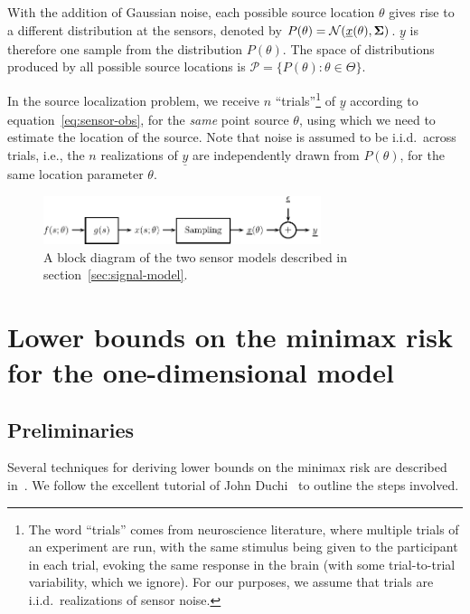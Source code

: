 \documentclass[conference,letterpaper]{IEEEtran}
\providecommand{\v}{}
\renewcommand{\v}[1]{\underline{#1}}
\providecommand{\m}{}
\renewcommand{\m}[1]{{\bf #1}}
\begin{document}
With the addition of Gaussian noise, each possible source location $\theta$
gives rise to a different distribution at the sensors, denoted by $P(\theta) =
\mathcal{N}(\v x(\theta), \m \Sigma)$. $\v y$ is therefore one sample from the
distribution $P(\theta)$. The space of distributions produced by all possible
source locations is $\mathcal{P} = \{P(\theta) : \theta \in \Theta \}$.

In the source localization problem, we receive $n$ ``trials''\footnote{The word
	``trials'' comes from neuroscience literature, where multiple trials of an
	experiment are run, with the same stimulus being given to the participant
	in each trial, evoking the same response in the brain (with some
trial-to-trial variability, which we ignore). For our purposes, we assume that
trials are i.i.d.\ realizations of sensor noise.} of $\v y$ according to
equation~\eqref{eq:sensor-obs}, for the \emph{same} point source $\theta$,
using which we need to estimate the location of the source. Note that noise is
assumed to be i.i.d.\ across trials, i.e., the $n$ realizations of $\v y$ are
independently drawn from $P(\theta)$, for the same location parameter $\theta$.

\begin{figure}[tp] %
	\centering
	\includegraphics[width=3.2in]{block-diagram}
	\vspace{-3pt}
	\caption{A block diagram of the two sensor models described in
	section~\ref{sec:signal-model}.}
	\label{fig:signal-model}
\end{figure}

\section{Lower bounds on the minimax risk for the one-dimensional model}
\label{sec:minimax-lower-bounds}

\subsection{Preliminaries}

Several techniques for deriving lower bounds on the minimax risk are described
in~\cite{Tsybakov2009Introduction}. We follow the excellent tutorial of John
Duchi~\cite{Duchi2015Information} to outline the steps involved.
\end{document}

